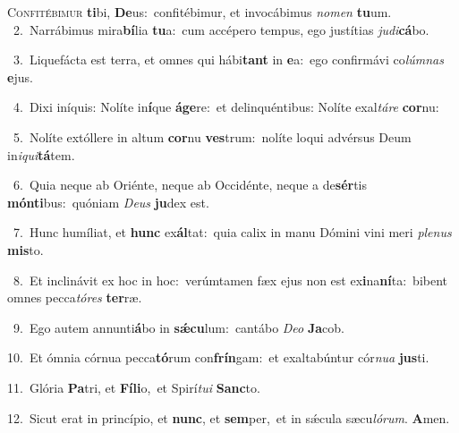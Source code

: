 \lettrine{\initial\textcolor{\initialcolor}{C}}{onfitébimur} \textbf{ti}\-bi, \textbf{De}\-us:~\star confitébimur, et invocábimus \textit{no}\-\textit{men} \textbf{tu}\-um.\\
{\numbfont\textcolor{\numbcolor}{~2.}}~Narrábimus mira\-\textbf{bí}\-lia \textbf{tu}\-a:~\star cum accépero tempus, ego justítias \textit{ju}\-\textit{di}\textbf{cá}bo.\par
{\numbfont\textcolor{\numbcolor}{~3.}}~Liquefácta est terra, et omnes qui hábi\textbf{tant} in \textbf{e}\-a:~\star ego confirmávi co\-\textit{lúm}\-\textit{nas} \textbf{e}\-jus.\par
{\numbfont\textcolor{\numbcolor}{~4.}}~Dixi iníquis: Nolíte in\-\textbf{í}\-que \textbf{á}\-\textbf{ge}re:~\star et delinquéntibus: Nolíte exal\-\textit{tá}\-\textit{re} \textbf{cor}\-nu:\par
{\numbfont\textcolor{\numbcolor}{~5.}}~Nolíte extóllere in altum \textbf{cor}\-nu \textbf{ves}\-trum:~\star nolíte loqui advérsus Deum in\-\textit{i}\-\textit{qui}\textbf{tá}tem.\par
{\numbfont\textcolor{\numbcolor}{~6.}}~Quia neque ab Oriénte, neque ab Occidénte, neque a de\-\textbf{sér}\-tis \textbf{món}\-\textbf{ti}bus:~\star quóniam \textit{De}\-\textit{us} \textbf{ju}\-dex est.\par
{\numbfont\textcolor{\numbcolor}{~7.}}~Hunc humíliat, et \textbf{hunc} ex\-\textbf{ál}\-tat:~\star quia calix in manu Dómini vini meri \textit{ple}\-\textit{nus} \textbf{mis}\-to.\par
{\numbfont\textcolor{\numbcolor}{~8.}}~Et inclinávit ex hoc in hoc:~\dagger verúmtamen fæx ejus non est ex\-\textbf{i}\-na\-\textbf{ní}\-ta:~\star bibent omnes pecca\-\textit{tó}\-\textit{res} \textbf{ter}\-ræ.\par
{\numbfont\textcolor{\numbcolor}{~9.}}~Ego autem annunti\-\textbf{á}\-bo in \textbf{sǽ}\-\textbf{cu}lum:~\star cantábo \textit{De}\-\textit{o} \textbf{Ja}\-cob.\par
{\numbfont\textcolor{\numbcolor}{10.}}~Et ómnia córnua pecca\-\textbf{tó}\-rum con\-\textbf{frín}\-gam:~\star et exaltabúntur cór\-\textit{nu}\-\textit{a} \textbf{jus}\-ti.\par
{\numbfont\textcolor{\numbcolor}{11.}}~Glória \textbf{Pa}\-tri, et \textbf{Fí}\-\textbf{li}o,~\star et Spirí\-\textit{tu}\-\textit{i} \textbf{Sanc}\-to.\par
{\numbfont\textcolor{\numbcolor}{12.}}~Sicut erat in princípio, et \textbf{nunc}\-, et \textbf{sem}\-per,~\star et in sǽcula sæcu\-\textit{ló}\-\textit{rum}. \textbf{A}\-men.\par
